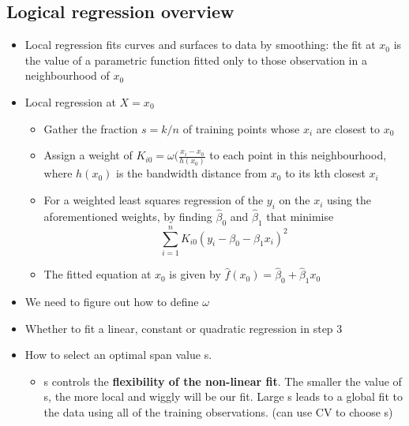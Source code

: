 \documentclass{article}
\begin{document}
\subsection{Logical regression overview}
\begin{itemize}
    \item Local regression fits curves and surfaces to data by smoothing: the fit at $x_0$ is the value of a parametric function fitted only to those observation in a neighbourhood of $x_0$
    \item Local regression at $X = x_0$
    \begin{itemize}
        \item Gather the fraction  $s = k/n $ of training points whose $x_i$ are closest to $x_0$
        \item Assign a weight of $K_{i0} = \omega (\frac{x_i - x_0}{h(x_0)}$ to each point in this neighbourhood, where $h(x_0)$ is the bandwidth distance from $x_0$ to its kth closest $x_i$
        \item For a weighted least squares regression of the $y_i$ on the $x_i$ using the aforementioned weights, by finding $\hat{\beta}_0$ and $\hat{\beta}_1$ that minimise
        \begin{equation*}
            \sum_{i=1}^n K_{i0} (y_i - \beta_0 - \beta_1 x_i)^2
        \end{equation*}
        \item The fitted equation at $x_0$ is given by $\hat{f}(x_0) = \hat{\beta}_0 + \hat{\beta}_1 x_0$
    \end{itemize}
    \item We need to figure out how to define $\omega$
    \item Whether to fit a linear, constant or quadratic regression in step 3
    \item How to select an optimal span value s.
    \begin{itemize}
        \item s controls the \textbf{flexibility of the non-linear fit}. The smaller the value of s, the more local and wiggly will be our fit. Large s leads to a global fit to the data using all of the training observations. (can use CV to choose s)
    \end{itemize}
\end{itemize}
\end{document}
